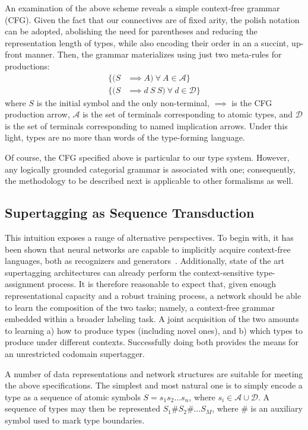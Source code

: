 An examination of the above scheme reveals a simple context-free grammar (CFG).
Given the fact that our connectives are of fixed arity, the polish notation~\cite{hamblin1962translation} can be adopted, abolishing the need for parentheses and reducing the representation length of types, while also encoding their order in an a succint, up-front manner.
Then, the grammar materializes using just two meta-rules for productions:
\begin{align}
\{ (S & \implies A) \  \forall \ A \in \mathcal{A} \}
\\
\{(S & \implies d \ S \ S) \ \forall \ d \in \mathcal{D} \}
\label{eqn:cfg}
\end{align}
where $S$ is the initial symbol and the only non-terminal, $\implies$ is the CFG production arrow, $\mathcal{A}$ is the set of terminals corresponding to atomic types, and $\mathcal{D}$ is the set of terminals corresponding to named implication arrows.
Under this light, types are no more than words of the type-forming language.

Of course, the CFG specified above is particular to our type system.
However, any logically grounded categorial grammar is associated with one; consequently, the methodology to be described next is applicable to other formalisms as well. 

\subsection{Supertagging as Sequence Transduction}
This intuition exposes a range of alternative perspectives.
To begin with, it has been shown that neural networks are capable to implicitly acquire context-free languages, both as recognizers and generators~\cite{noPhysics}.
Additionally, state of the art supertagging architectures can already perform the context-sensitive type-assignment process.
It is therefore reasonable to expect that, given enough representational capacity and a robust training process, a network should be able to learn the composition of the two tasks; namely, a context-free grammar embedded within a broader labeling task.
A joint acquisition of the two amounts to learning a) how to produce types (including novel ones), and b) which types to produce under different contexts.
Successfully doing both provides the means for an unrestricted codomain supertagger.

A number of data representations and network structures are suitable for meeting the above specifications.
The simplest and most natural one is to simply encode a type as a sequence of atomic symbols $S = s_1 s_2\dots s_n$, where $s_i \in \mathcal{A}\cup\mathcal{D}$.
A sequence of types may then be represented $S_1 \# S_2 \# \dots S_M$, where \# is an auxiliary symbol used to mark type boundaries.

